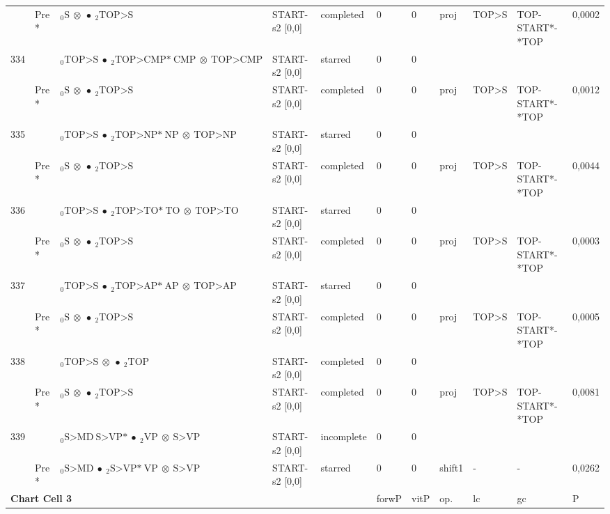 \documentclass[10pt]{article}
\begin{document}
\begin{longtable}[htbp]{lllllllllll}
 & Pre *& $ {}_0 \textrm{S} \  \otimes \  \bullet \ {}_{2} \textrm{TOP>S} $ & START-s2 [0,0] & completed & 0 & 0 & proj & TOP>S & TOP-START*-*TOP & 0,0002 \\ 
334 & & $ {}_0 \textrm{TOP>S} \  \bullet \ {}_{2} \textrm{TOP>CMP*} \ \textrm{CMP} \  \otimes \ \textrm{TOP>CMP} $ & START-s2 [0,0] & starred & 0 & 0 & & & & \\ 
 & Pre *& $ {}_0 \textrm{S} \  \otimes \  \bullet \ {}_{2} \textrm{TOP>S} $ & START-s2 [0,0] & completed & 0 & 0 & proj & TOP>S & TOP-START*-*TOP & 0,0012 \\ 
335 & & $ {}_0 \textrm{TOP>S} \  \bullet \ {}_{2} \textrm{TOP>NP*} \ \textrm{NP} \  \otimes \ \textrm{TOP>NP} $ & START-s2 [0,0] & starred & 0 & 0 & & & & \\ 
 & Pre *& $ {}_0 \textrm{S} \  \otimes \  \bullet \ {}_{2} \textrm{TOP>S} $ & START-s2 [0,0] & completed & 0 & 0 & proj & TOP>S & TOP-START*-*TOP & 0,0044 \\ 
336 & & $ {}_0 \textrm{TOP>S} \  \bullet \ {}_{2} \textrm{TOP>TO*} \ \textrm{TO} \  \otimes \ \textrm{TOP>TO} $ & START-s2 [0,0] & starred & 0 & 0 & & & & \\ 
 & Pre *& $ {}_0 \textrm{S} \  \otimes \  \bullet \ {}_{2} \textrm{TOP>S} $ & START-s2 [0,0] & completed & 0 & 0 & proj & TOP>S & TOP-START*-*TOP & 0,0003 \\ 
337 & & $ {}_0 \textrm{TOP>S} \  \bullet \ {}_{2} \textrm{TOP>AP*} \ \textrm{AP} \  \otimes \ \textrm{TOP>AP} $ & START-s2 [0,0] & starred & 0 & 0 & & & & \\ 
 & Pre *& $ {}_0 \textrm{S} \  \otimes \  \bullet \ {}_{2} \textrm{TOP>S} $ & START-s2 [0,0] & completed & 0 & 0 & proj & TOP>S & TOP-START*-*TOP & 0,0005 \\ 
338 & & $ {}_0 \textrm{TOP>S} \  \otimes \  \bullet \ {}_{2} \textrm{TOP} $ & START-s2 [0,0] & completed & 0 & 0 & & & & \\ 
 & Pre *& $ {}_0 \textrm{S} \  \otimes \  \bullet \ {}_{2} \textrm{TOP>S} $ & START-s2 [0,0] & completed & 0 & 0 & proj & TOP>S & TOP-START*-*TOP & 0,0081 \\ 
339 & & $ {}_0 \textrm{S>MD} \ \textrm{S>VP*} \  \bullet \ {}_{2} \textrm{VP} \  \otimes \ \textrm{S>VP} $ & START-s2 [0,0] & incomplete & 0 & 0 & & & & \\ 
 & Pre *& $ {}_0 \textrm{S>MD} \  \bullet \ {}_{2} \textrm{S>VP*} \ \textrm{VP} \  \otimes \ \textrm{S>VP} $ & START-s2 [0,0] & starred & 0 & 0 & shift1 & - & - & 0,0262 \\ 
\hline \multicolumn{5}{l}{\textbf{Chart Cell 3}} & forwP & vitP & op. & lc & gc & P \\ \hline

\end{longtable}
\end{document}
